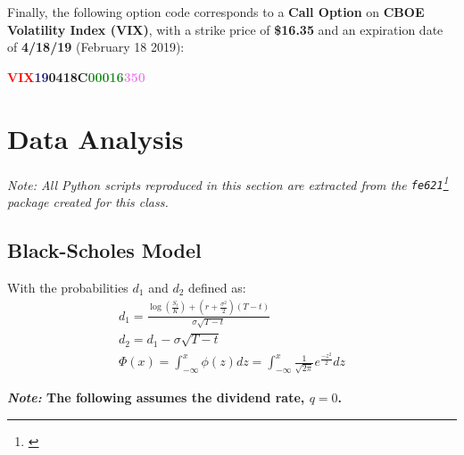 \documentclass[10pt]{article}
\newcommand*\lstinputpath[1]{\lstset{inputpath=#1}} %
\begin{document}
        Finally, the following option code corresponds to a \textbf{Call Option} on \textbf{CBOE Volatility Index (VIX)}, with a strike price of \textbf{\$16.35} and an expiration date of \textbf{4/18/19} (February 18 2019):
    
        \begin{center}
            \textbf{\textcolor{red}{VIX}\textcolor{MidnightBlue}{19}\textcolor{Bittersweet}{04}\textcolor{YellowOrange}{18}\textcolor{RoyalPurple}{C}\textcolor{ForestGreen}{00016}\textcolor{violet}{350}}
        \end{center}



\newpage

\lstinputpath{..}

\section{Data Analysis}

    \begin{center}
        \textit{Note: All Python scripts reproduced in this section are extracted from the {\normalfont \texttt{fe621}}\footnote{\cite{Weerawarana2019}} package created for this class.}
    \end{center}

    \subsection{Black-Scholes Model}

    With the probabilities $d_1$ and $d_2$ defined as:
    \begin{gather*}
        d_1 = \frac{\log \left( \frac{S_t}{K} \right) + \left( r + \frac{\sigma^2}{2} \right) (T-t)}{\sigma \sqrt{T-t}} \\
        d_2 = d_1 - \sigma \sqrt{T-t} \\
        \Phi(x) = \int_{-\infty}^{x} \phi(z) dz = \int_{-\infty}^{x} \frac{1}{\sqrt{2\pi}} e^{\frac{-z^2}{2}} dz
    \end{gather*}

    

    \pagebreak[4]

    \begin{center}
        \textbf{\textit{Note:} The following assumes the dividend rate, $q = 0$.}
    \end{center}
\end{document}
